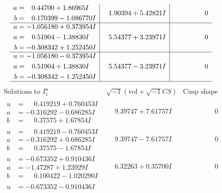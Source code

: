\documentclass[1p]{elsarticle_modified}
\theoremstyle{definition}
\newcommand{\I}{\sqrt{-1}}
\begin{document}
$$\begin{array}{c|c|c}
\begin{aligned}
a &= \phantom{-}0.44700 + 1.86965 I \\
b &= \phantom{-}0.170399 - 1.086770 I\end{aligned}
 & \phantom{-}1.90394 + 5.42821 I & \phantom{-0.000000 } 0 \\ \hline\begin{aligned}
u &= -1.056180 + 0.373954 I \\
a &= \phantom{-}0.51904 - 1.38830 I \\
b &= -0.308342 + 1.252450 I\end{aligned}
 & \phantom{-}5.54377 + 3.23971 I & \phantom{-0.000000 } 0 \\ \hline\begin{aligned}
u &= -1.056180 - 0.373954 I \\
a &= \phantom{-}0.51904 + 1.38830 I \\
b &= -0.308342 - 1.252450 I\end{aligned}
 & \phantom{-}5.54377 - 3.23971 I & \phantom{-0.000000 } 0\\
 \hline 
 \end{array}$$\newpage$$\begin{array}{c|c|c}  
\text{Solutions to }I^u_{1}& \I (\text{vol} + \sqrt{-1}CS) & \text{Cusp shape}\\
 \hline 
\begin{aligned}
u &= \phantom{-}0.419219 + 0.760453 I \\
a &= -0.316292 - 0.686285 I \\
b &= \phantom{-}0.37575 + 1.67854 I\end{aligned}
 & \phantom{-}9.39747 + 7.61757 I & \phantom{-0.000000 } 0 \\ \hline\begin{aligned}
u &= \phantom{-}0.419219 - 0.760453 I \\
a &= -0.316292 + 0.686285 I \\
b &= \phantom{-}0.37575 - 1.67854 I\end{aligned}
 & \phantom{-}9.39747 - 7.61757 I & \phantom{-0.000000 } 0 \\ \hline\begin{aligned}
u &= -0.673352 + 0.910436 I \\
a &= -1.47287 + 1.23929 I \\
b &= \phantom{-}0.100422 - 1.020290 I\end{aligned}
 & \phantom{-}6.32263 + 0.35700 I & \phantom{-0.000000 } 0 \\ \hline\begin{aligned}
u &= -0.673352 - 0.910436 I \\

\end{aligned}
\end{array}$$
\end{document}
